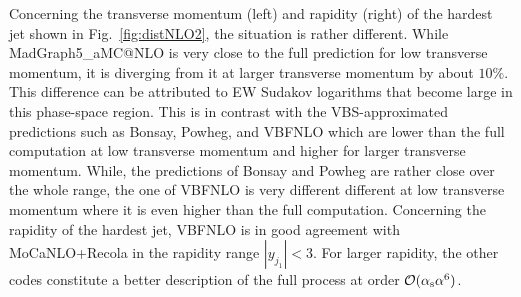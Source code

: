 Concerning the transverse momentum (left) and rapidity (right) of the hardest jet shown in Fig.~\ref{fig:distNLO2}, the situation is rather different.
While {\sc MadGraph5\_aMC\-@NLO} is very close to the full prediction for low transverse momentum, it is diverging from it at larger transverse momentum by about $10\%$.
This difference can be attributed to EW Sudakov logarithms that become large in this phase-space region.
This is in contrast with the VBS-approximated predictions such as {\sc Bonsay}, {\sc Powheg}, and {\sc VBFNLO} which are lower than the full computation at low transverse momentum and higher for larger transverse momentum.
While, the predictions of {\sc Bonsay} and {\sc Powheg} are rather close over the whole range, the one of {\sc VBFNLO} is very different different at low transverse momentum where it is even higher than the full computation.
Concerning the rapidity of the hardest jet, {\sc VBFNLO} is in good agreement with {\sc MoCaNLO}+{\sc Recola} in the rapidity range $|y_{j_1}| < 3$.
For larger rapidity, the other codes constitute a better description of the full process at order $\mathcal{O}(\alpha_{\rm s}\alpha^6)$.

